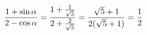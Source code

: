 \documentclass[preview]{standalone}
\begin{document}
\begin{align*}
\special{dvisvgm:raw <g id='unique000'>}\frac{1+\sin\alpha}{2-\cos\alpha}=\frac{1+\frac{1}{\sqrt{5}}}{2+\frac{2}{\sqrt{5}}}=\frac{\sqrt{5}+1}{2(\sqrt{5}+1)}=\frac{1}{2}\special{dvisvgm:raw </g>}
\end{align*}
\end{document}
